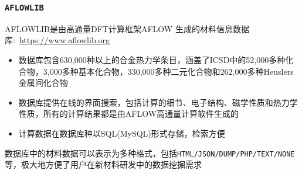 \frame
{
\frametitle{\tt{AFLOWLIB}}
\textrm{AFLOWLIB}是由高通量\textrm{DFT}计算框架\textrm{AFLOW}%
生成的材料信息数据库:~\url{https://www.aflowlib.org}
\vskip 3pt
{\fontsize{7.5pt}{4.2pt}}%
\begin{itemize}
	\item 数据库包含\textrm{630,000}种以上的合金热力学条目，涵盖了\textrm{ICSD}中的\textrm{52,000}多种化合物，\textrm{3,000}多种基本化合物，\textrm{330,000}多种二元化合物和\textrm{262,000}多种\textrm{Heuslers}金属间化合物
	\item 数据库提供在线的界面搜索，包括计算的细节、电子结构、磁学性质和热力学性质，所有的计算结果都是由\textrm{AFLOW}高通量计算软件生成的
	\item 计算数据在数据库种以\textrm{SQL}(\textrm{MySQL})形式存储，检索方便
		\vskip 2pt
		{\fontsize{7.5pt}{4.2pt}}%
\end{itemize}
数据库中的材料数据可以表示为多种格式，包括\texttt{HTML/JSON/DUMP/PHP/TEXT/NONE}等，极大地方便了用户在新材料研发中的数据挖掘需求
}

